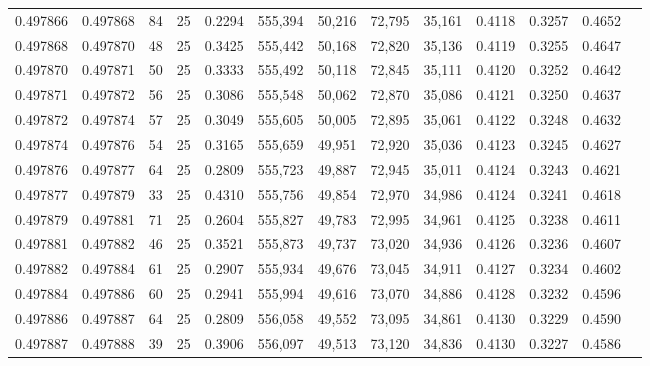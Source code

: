 \begin{tabular}{rrrrrrrrrrrrr}
0.497866 & 0.497868 &    84 &  25 &                                     0.2294 & 555,394 &  50,216 &  72,795 &  35,161 & 0.4118 & 0.3257 & 0.4652 \\
0.497868 & 0.497870 &    48 &  25 &                                     0.3425 & 555,442 &  50,168 &  72,820 &  35,136 & 0.4119 & 0.3255 & 0.4647 \\
0.497870 & 0.497871 &    50 &  25 &                                     0.3333 & 555,492 &  50,118 &  72,845 &  35,111 & 0.4120 & 0.3252 & 0.4642 \\
0.497871 & 0.497872 &    56 &  25 &                                     0.3086 & 555,548 &  50,062 &  72,870 &  35,086 & 0.4121 & 0.3250 & 0.4637 \\
0.497872 & 0.497874 &    57 &  25 &                                     0.3049 & 555,605 &  50,005 &  72,895 &  35,061 & 0.4122 & 0.3248 & 0.4632 \\
0.497874 & 0.497876 &    54 &  25 &                                     0.3165 & 555,659 &  49,951 &  72,920 &  35,036 & 0.4123 & 0.3245 & 0.4627 \\
0.497876 & 0.497877 &    64 &  25 &                                     0.2809 & 555,723 &  49,887 &  72,945 &  35,011 & 0.4124 & 0.3243 & 0.4621 \\
0.497877 & 0.497879 &    33 &  25 &                                     0.4310 & 555,756 &  49,854 &  72,970 &  34,986 & 0.4124 & 0.3241 & 0.4618 \\
0.497879 & 0.497881 &    71 &  25 &                                     0.2604 & 555,827 &  49,783 &  72,995 &  34,961 & 0.4125 & 0.3238 & 0.4611 \\
0.497881 & 0.497882 &    46 &  25 &                                     0.3521 & 555,873 &  49,737 &  73,020 &  34,936 & 0.4126 & 0.3236 & 0.4607 \\
0.497882 & 0.497884 &    61 &  25 &                                     0.2907 & 555,934 &  49,676 &  73,045 &  34,911 & 0.4127 & 0.3234 & 0.4602 \\
0.497884 & 0.497886 &    60 &  25 &                                     0.2941 & 555,994 &  49,616 &  73,070 &  34,886 & 0.4128 & 0.3232 & 0.4596 \\
0.497886 & 0.497887 &    64 &  25 &                                     0.2809 & 556,058 &  49,552 &  73,095 &  34,861 & 0.4130 & 0.3229 & 0.4590 \\
0.497887 & 0.497888 &    39 &  25 &                                     0.3906 & 556,097 &  49,513 &  73,120 &  34,836 & 0.4130 & 0.3227 & 0.4586 \\

\end{tabular}
